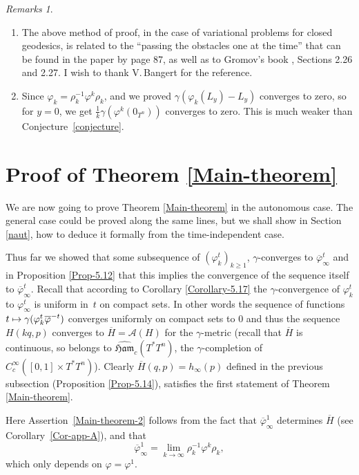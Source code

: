 \documentclass[JEP,XML,SOM,NoFloatCountersInSection,Unicode,published]{cedram}
\newcommand\mto{\mathchoice{\longmapsto}{\mapsto}{\mapsto}{\mapsto}}
\numberwithin{equation}{section}
\newcommand {\Ham}{{\mathfrak {Ham}}}
\newcommand{\gclHamc}[1]{\widehat{\Ham}_c(#1)}
\let \phi \varphi
\theoremstyle{plain}
\theoremstyle{definition}
\theoremstyle{remark}
\newtheorem{remarks}[theorem]{Remarks}
\begin{document}
\skpt
\begin{remarks}
\begin{enumerate}
\item The above method of proof, in the case of variational problems for closed geodesics, is related to the ``passing the obstacles one at the time'' that can be found in the paper by \cite{Bangert} page 87, as well as to Gromov's book \cite{Gromov}, Sections 2.26 and 2.27. I wish to thank V.\,Bangert for the reference.
\item Since $\varphi_k=\rho_k^{-1}\varphi^k\rho_k$, and we proved $\gamma (\varphi_k(L_y)-L_y)$ converges to zero, so for $y=0$, we get $\frac{1}{k} \gamma (\phi^k(0_{T^n}))$ converges to zero. This is much weaker than Conjecture~\ref{conjecture}.
\end{enumerate}
\end{remarks}

\section{Proof of Theorem \ref{Main-theorem}}
We are now going to prove Theorem \ref{Main-theorem} in the autonomous case. The general case could be proved along the same lines, but we shall show in Section \ref{naut}, how to deduce it formally from the time-independent case.

Thus far we showed that some subsequence of $(\phi_{k}^{t})_{k\geq 1}$, $\gamma$-converges to $\overline \phi_\infty^{t}$ and in Proposition \ref{Prop-5.12} that this implies the convergence of the sequence itself to $\overline \phi_\infty^{t}$. Recall that according to Corollary \ref{Corollary-5.17} the $\gamma$-convergence of $\varphi_k^t$ to $\varphi_\infty^t$ is uniform in~$t$ on compact sets. In other words the sequence of functions $t \mto \gamma(\varphi_k^t\overline\varphi^{-t})$ converges uniformly on compact sets to $0$ and thus the sequence $H(kq,p)$ converges to $\overline{H}=\mathcal A (H)$ for the $\gamma$-metric (recall that $\overline H$ is continuous, so belongs to $\gclHamc{T^*T^n}$, the $\gamma$\nobreakdash-completion of $C_c^\infty([0,1]\times T^*T^n)$). Clearly $\overline H (q,p)=h_{\infty }(p)$ defined in the previous subsection (Proposition \ref{Prop-5.14}), satisfies the first statement of Theorem \ref{Main-theorem}.

Here Assertion~\eqref{Main-theorem-2} follows from the fact that $\overline\varphi_\infty^{1}$ determines $\overline H$ (see Corollary~\ref{Cor-app-A}), and that
\[
\overline\varphi_\infty^{1}= \lim_{k\to \infty} \rho_{k}^{-1}\phi^{k}\rho_{k},
\]
which only depends on $\varphi=\varphi ^{1}$.
\end{document}
